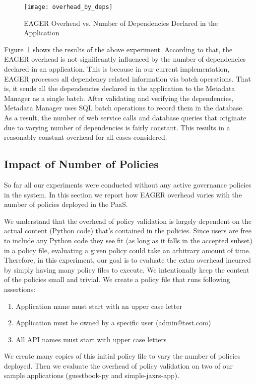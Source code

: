 \begin{figure}
\centering
\texttt{[image: overhead\_by\_deps]}
\caption{EAGER Overhead vs. Number of Dependencies Declared in the Application}
\label{fig:overhead_by_deps}
\end{figure}

Figure~\ref{fig:overhead_by_deps} shows the results of the above experiment. According to that, the EAGER overhead is not significantly
influenced by the number of dependencies declared in an application. This is because in our current implementation, EAGER processes
all dependency related information via batch operations. That is, it sends all the dependencies declared in the application to the Metadata
Manager as a single batch. After validating and verifying the dependencies, Metadata Manager uses SQL batch operations to record
them in the database. As a result, the number of web service calls and database queries that originate due to varying number of dependencies
is fairly constant. This results in a reasonably constant overhead for all cases considered.

\subsection{Impact of Number of Policies}

So far all our experiments were conducted without any active governance policies in the system. In this section we report how EAGER overhead
varies with the number of policies deployed in the PaaS. 

We understand that the overhead of policy validation is largely dependent
on the actual content (Python code) that's contained in the policies. Since users are free to include any Python code they see fit (as long as it
falls in the accepted subset) in a policy file, evaluating a given policy could take an arbitrary amount of time. Therefore, in this experiment, our
goal is to evaluate the extra overhead incurred by simply having many policy files to execute. We intentionally keep the content of the policies
small and trivial. We create a policy file that runs following assertions:
\begin{enumerate}
\item Application name must start with an upper case letter
\item Application must be owned by a specific user (admin@test.com)
\item All API names must start with upper case letters
\end{enumerate}
We create many copies of this initial policy file to vary the number of policies deployed. Then we evaluate the overhead of policy validation
on two of our sample applications (guestbook-py and simple-jaxrs-app). 

